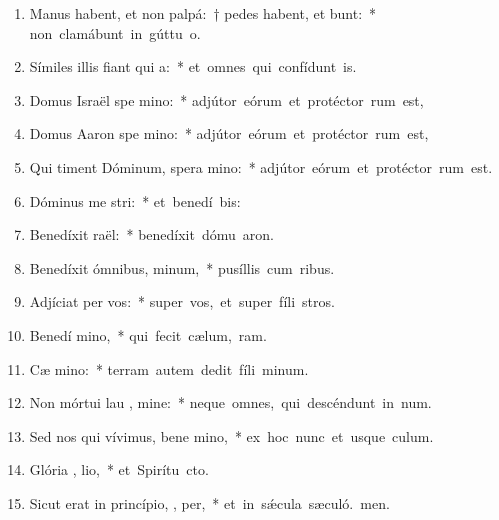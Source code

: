 \begin{flushleft}
\begin{enumerate}[leftmargin=*]
\item Manus habent, et non palpá:~† pedes habent, et  bunt:~* \mbox{non clamábunt in gúttu o.}
\item Símiles illis fiant qui  a:~* \mbox{et omnes qui confídunt  is.}
\item Domus Israël spe  mino:~* \mbox{adjútor eórum et protéctor rum est,}
\item Domus Aaron spe  mino:~* \mbox{adjútor eórum et protéctor rum est,}
\item Qui timent Dóminum, spera  mino:~* \mbox{adjútor eórum et protéctor rum est.}
\item Dóminus me  stri:~* \mbox{et benedí bis:}
\item Benedíxit  raël:~* \mbox{benedíxit dómu aron.}
\item Benedíxit ómnibus,   minum,~* \mbox{pusíllis cum ribus.}
\item Adjíciat  per vos:~* \mbox{super vos, et super fíli stros.}
\item Benedí   mino,~* \mbox{qui fecit cælum,  ram.}
\item Cæ  mino:~* \mbox{terram autem dedit fíli minum.}
\item Non mórtui lau , mine:~* \mbox{neque omnes, qui descéndunt in num.}
\item Sed nos qui vívimus, bene mino,~* \mbox{ex hoc nunc et usque  culum.}
\item Glória ,  lio,~* \mbox{et Spirítu cto.}
\item Sicut erat in princípio,  ,  per,~* \mbox{et in s\'{\ae}cula sæculó. men.}

\end{enumerate}
\end{flushleft}

